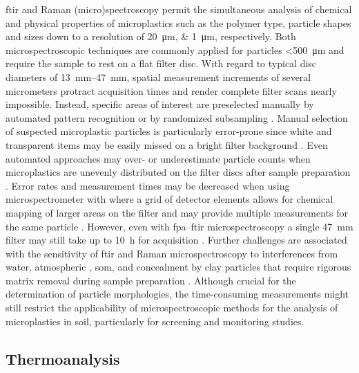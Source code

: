 \ac{ftir} and Raman (micro)spectroscopy permit the simultaneous analysis of chemical and physical properties of microplastics such as the polymer type, particle shapes and sizes down to a resolution of \SIlist{20;1}{\micro\meter},
respectively. Both microspectroscopic techniques are commonly applied for particles \SI{<500}{\micro\meter} and require the sample to rest on a flat filter disc. With regard to typical disc diameters of \SIrange{13}{47}{\milli\meter}, spatial measurement increments of several micrometers protract acquisition times and render complete filter scans nearly impossible. Instead, specific areas of interest are preselected manually by automated pattern recognition or by randomized subsampling \citep{AngerRaman2018,XuFTIR2019}. Manual selection of suspected microplastic particles is particularly error-prone since white and transparent items may be easily missed on a bright filter background \citep{LaresIntercomparison2019}. Even automated approaches may over-
or underestimate particle counts when microplastics are unevenly distributed on the filter discs after sample preparation \citep{AngerRaman2018}. Error rates and measurement times may be decreased when using  microspectrometer with  where a grid of detector elements allows for chemical mapping of larger areas on the filter and may provide multiple measurements for the same particle \citep{SimonQuantification2018}. However, even with \ac{fpa}--\ac{ftir} microspectroscopy a single \SI{47}{\milli\meter} filter may still take up to \SI{10}{\hour} for acquisition \citep{MintenigIdentification2017}. Further challenges are associated with the sensitivity of \ac{ftir} and Raman microspectroscopy to interferences from water, atmospheric , \ac{som}, and concealment by clay particles that require rigorous matrix removal during sample preparation \citep{AngerRaman2018,XuFTIR2019}. Although crucial for the determination of particle morphologies, the time-consuming measurements might still restrict the applicability of microspectroscopic methods for the analysis of microplastics in soil, particularly for screening and monitoring studies.

\subsection{Thermoanalysis}
\label{sec:analytical-techniques:thermoanalysis}

